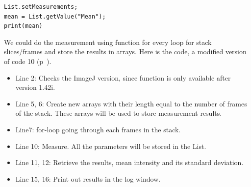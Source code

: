 \begin{lstlisting}
List.setMeasurements;
mean = List.getValue("Mean");
print(mean)
\end{lstlisting}

We could do the measurement using  function for every loop for stack slices/frames and store the results in arrays. Here is the code, a modified version of code 10 (p~\pageref{code:10}). 



\begin{itemize}
  \item Line 2: Checks the ImageJ version, since  function is only available after version 1.42i.
  \item Line 5, 6: Create new arrays with their length equal to the number of frames of the stack. These arrays will be used to store measurement results. 
  \item Line7: for-loop going through each frames in the stack.
  \item Line 10: Measure. All the parameters will be stored in the List. 
  \item Line 11, 12: Retrieve the results, mean intensity and its standard deviation. 
  \item Line 15, 16: Print out results in the log window. 
\end{itemize}
